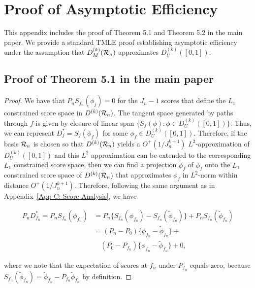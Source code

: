 \section{Proof of Asymptotic Efficiency} \label{app_f: Asymp Efficiency}
This appendix includes the proof of Theorem 5.1 and Theorem 5.2 in the main paper. We provide a standard TMLE proof establishing asymptotic efficiency under the assumption that $D^{(k)}_M({\cal R}_n)$ approximates $D^{(k)}_U([0,1])$. 

\subsection{Proof of Theorem 5.1 in the main paper}
\begin{proof}
We have that $P_n S_{f_n}(\phi_j)=0$ for the $J_n - 1$ scores that define the $L_1$ constrained score space in $D^{(k)}({\cal R}_n)$. The tangent space generated by paths through $f$ is given by closure of linear span $\{S_f(\phi): \phi\in D^{(k)}_U([0,1])\}$. Thus, we can represent 
$D^*_f=S_f(\phi_f)$ for some $\phi_f\in D^{(k)}_U([0,1])$. Therefore, if the basis ${\cal R}_n$ is chosen so that $D^{(k)}({\cal R}_n)$  yields a $O^+(1/J_n^{k+1})$ $L^2$-approximation of $D^{(k)}_U([0,1])$ and this $L^2$ approximation can be extended to the corresponding $L_1$ constrained score space, then we can find a projection $\tilde{\phi}_f$ of $\phi_f$ onto the $L_1$ constrained score space of $D^{(k)}({\cal R}_n)$ that approximates $\phi_f$ in $L^2$-norm within distance $O^+(1/J_n^{k+1})$.
Therefore, following the same argument as in Appendix~\ref{App C: Score Analysis}, we have

\begin{align*}
P_n D^*_{f_n}=P_n S_{f_n}(\phi_{f_n})
&=P_n\{S_{f_n}(\phi_{f_n})-S_{f_n}(\tilde{\phi}_{f_n})\} + P_nS_{f_n}(\tilde{\phi}_{f_n})\\
&=(P_n-P_0)\{\phi_{f_n} - \tilde{\phi}_{f_n}\}+ \\
&\quad(P_0- P_{f_n})\{\phi_{f_n} - \tilde{\phi}_{f_n}\} + 0,
\end{align*}

where we note that the expectation of scores at $f_n$ under $P_{f_n}$ equals zero, because $S_{f_n}(\tilde{\phi}_{f_n}) = \tilde{\phi}_{f_n} - P_{f_n}\tilde{\phi}_{f_n}$ by definition.


\end{proof}
